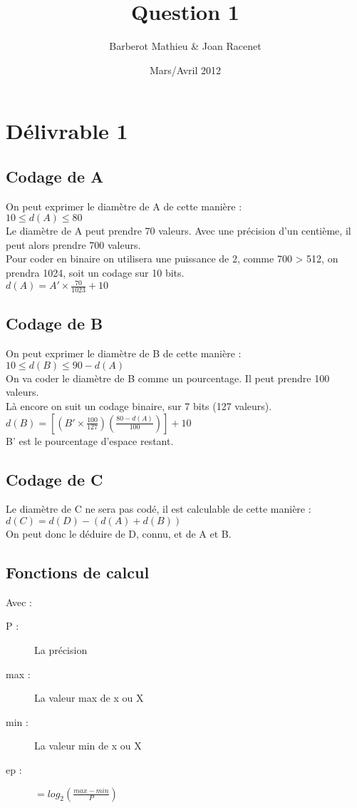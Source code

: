 \documentclass[12pt]{article}
\title{Question 1}
\date{Mars/Avril 2012}
\author{Barberot Mathieu \& Joan Racenet}
\begin{document}
\maketitle
{}
\section{Délivrable 1}
\subsection{Codage de A}
\noindent On peut exprimer le diamètre de A de cette manière :\\
$10 \leq d(A) \leq 80 $\\
Le diamètre de A peut prendre 70 valeurs. Avec une précision d'un centième, il peut alors prendre 700 valeurs.\\
Pour coder en binaire on utilisera une puissance de 2, comme 700 > 512, on prendra 1024, soit un codage sur 10 bits.\\
$d(A) = A'\times\frac{70}{1023} + 10$

\subsection{Codage de B}
\noindent On peut exprimer le diamètre de B de cette manière :\\
$10 \leq d(B) \leq 90 - d(A)$\\
On va coder le diamètre de B comme un pourcentage. Il peut prendre 100 valeurs.\\
Là encore on suit un codage binaire, sur 7 bits (127 valeurs).\\
$d(B) = [(B'\times\frac{100}{127})(\frac{80-d(A)}{100})]+10$\\
B' est le pourcentage d'espace restant.

\subsection{Codage de C}
\noindent Le diamètre de C ne sera pas codé, il est calculable de cette manière :\\
$d(C) = d(D) - (d(A) + d(B))$\\
On peut donc le déduire de D, connu, et de A et B.

\subsection{Fonctions de calcul}
Avec :
\begin{description}
 \item[P :] La précision
 \item[max :] La valeur max de x ou X 
 \item[min :] La valeur min de x ou X
 \item[ep :] $= log_{2}(\frac{max - min}{P})$
\end{description}
\end{document}
